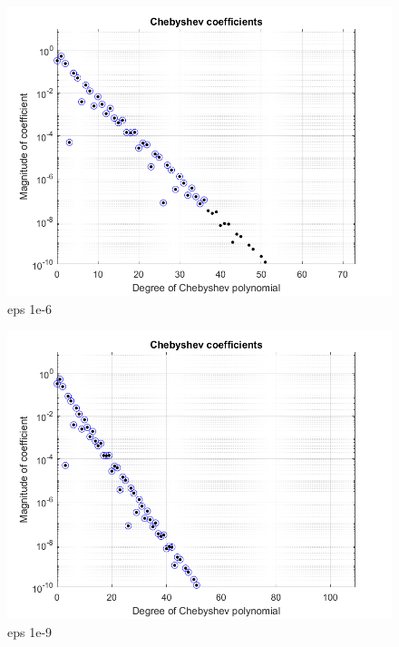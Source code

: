 \documentclass{article}
\begin{document}
\begin{figure}[h!]
\centering
\includegraphics[scale=.5]{-6f.png}
\caption{eps 1e-6}
\label{fig:-6f}
\end{figure}

\begin{figure}[h!]
\centering
\includegraphics[scale=0.5]{-9f.png}
\caption{eps 1e-9}
\label{fig:-9f}
\end{figure}
\end{document}
